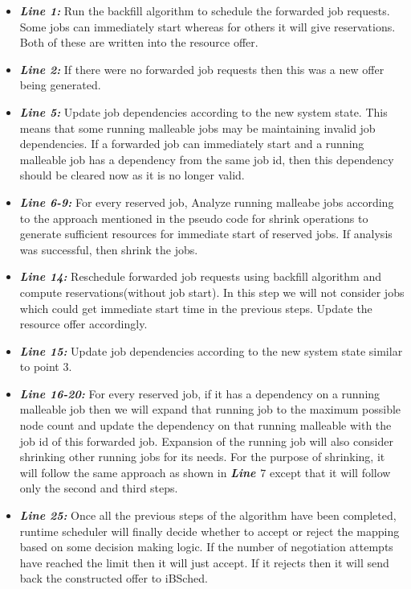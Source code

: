 \begin{itemize}
\item \textbf{\textit{Line 1:}} Run the backfill algorithm to schedule the forwarded job requests. Some jobs can immediately start whereas for others it will give reservations. Both of these are written into the resource offer.
\item \textbf{\textit{Line 2:}} If there were no forwarded job requests then this was a new offer being generated.
\item \textbf{\textit{Line 5:}} Update job dependencies according to the new system state. This means that some running malleable jobs may be maintaining invalid job dependencies. If a forwarded job can immediately start and a running malleable job has a dependency from the same job id, then this dependency should be cleared now as it is no longer valid. 
\item \textbf{\textit{Line 6-9:}} For every reserved job, Analyze running malleabe jobs according to the approach mentioned in the pseudo code for shrink operations to generate sufficient resources for immediate start of reserved jobs. If analysis was successful, then shrink the jobs.
\item \textbf{\textit{Line 14:}} Reschedule forwarded job requests using backfill algorithm and compute reservations(without job start). In this step we will not consider jobs which could get immediate start time in the previous steps. Update the resource offer accordingly.
\item \textbf{\textit{Line 15:}} Update job dependencies according to the new system state similar to point $3$.
\item \textbf{\textit{Line 16-20:}} For every reserved job, if it has a dependency on a running malleable job then we will expand that running job to the maximum possible node count and update the dependency on that running malleable with the job id of this forwarded job. Expansion of the running job will also consider shrinking other running jobs for its needs. For the purpose of shrinking, it will follow the same approach as shown in \textbf{\textit{Line $7$}} except that it will follow only the second and third steps.
\item \textbf{\textit{Line 25:}} Once all the previous steps of the algorithm have been completed, runtime scheduler will finally decide whether to accept or reject the mapping based on some decision making logic. If the number of negotiation attempts have reached the limit then it will just accept. If it rejects then it will send back the constructed offer to iBSched.
\end{itemize}
